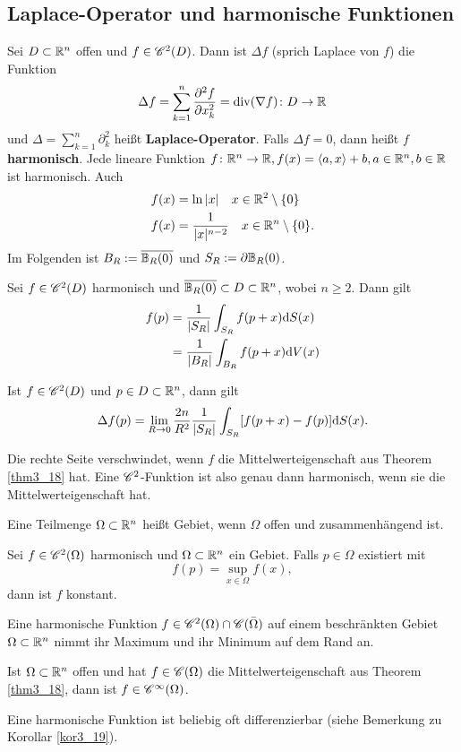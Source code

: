 \subsection{Laplace-Operator und harmonische Funktionen}
Sei $D \subset \mathbb{R}^n$ offen und $f \in \mathscr{C}^2(D)$. Dann ist $\Delta f$ (sprich Laplace von $f$) die Funktion
\[\Delta f = \sum_{k=1}^n \frac{\partial^2 f}{\partial x_k^2} = \mathrm{div}(\nabla f) \colon D \to \mathbb{R}\]
und $\Delta = \sum_{k=1}^n \partial_k^2$ heißt \textbf{Laplace-Operator}. Falls $\Delta f = 0$, dann heißt $f$ \textbf{harmonisch}. Jede lineare Funktion $f \colon \mathbb{R}^n \to \mathbb{R}, f(x) = \left\langle a,x \right\rangle + b, a \in \mathbb{R}^n, b \in \mathbb{R}$ ist harmonisch. Auch
\begin{align*}
	f(x) &= \ln |x| \quad x \in \mathbb{R}^2 \setminus \{0\}\\
	f(x) &= \frac{1}{|x|^{n-2}} \quad x \in \mathbb{R}^n \setminus  \{0\}.
\end{align*}
Im Folgenden ist $B_R := \overline{\mathbb{B}_R(0)}$ und $S_R := \partial \mathbb{B}_R(0)$. 
\begin{thm}\label{thm3_18}
	Sei $f \in \mathscr{C}^2 (D)$ harmonisch und $\overline{\mathbb{B}_R(0)} \subset D \subset \mathbb{R}^n$, wobei $n \geq 2$. Dann gilt
	\begin{align*}
		f(p) &= \frac{1}{|S_R|} \int_{S_R} f(p+x) \mathrm{d} S(x)\\
		&= \frac{1}{|B_R|} \int_{B_R} f(p+x) \mathrm{d} V(x)
	\end{align*}
\end{thm}
\begin{kor}\label{kor3_19}
	Ist $f \in \mathscr{C}^2(D)$ und $p \in D \subset \mathbb{R}^n$, dann gilt
	\[\Delta f(p) = \lim_{R \to 0} \frac{2n}{R^2} \frac{1}{|S_R|} \int_{S_R} [f(p+x) - f(p)] \mathrm{d} S(x).\]
\end{kor}
\begin{rem}
	Die rechte Seite verschwindet, wenn $f$ die Mittelwerteigenschaft aus Theorem \ref{thm3_18} hat. Eine $\mathscr{C}^2$-Funktion ist also genau dann harmonisch, wenn sie die Mittelwerteigenschaft hat.
\end{rem}
Eine Teilmenge $\Omega \subset \mathbb{R}^n$ heißt Gebiet, wenn $\Omega$ offen und zusammenhängend ist. 
\begin{thm}[Maximumsprinzip]\label{thm3_20}
	Sei $f \in \mathscr{C}^2(\Omega)$ harmonisch und $\Omega \subset \mathbb{R}^n$ ein Gebiet. Falls $p \in \Omega$ existiert mit
	\[f(p) = \sup_{x \in \Omega} f(x),\]
	dann ist $f$ konstant.
\end{thm}
\begin{kor}\label{kor3_21}
	Eine harmonische Funktion $f \in \mathscr{C}^2 (\Omega) \cap \mathscr{C}(\bar{\Omega})$ auf einem beschränkten Gebiet $\Omega \subset \mathbb{R}^n$ nimmt ihr Maximum und ihr Minimum auf dem Rand an.
\end{kor}
\begin{thm}
	Ist $\Omega \subset \mathbb{R}^n$ offen und hat $f \in \mathscr{C}(\Omega)$ die Mittelwerteigenschaft aus Theorem \ref{thm3_18}, dann ist $f \in \mathscr{C}^\infty (\Omega)$.
\end{thm}
\begin{folgerung}
	Eine harmonische Funktion ist beliebig oft differenzierbar (siehe Bemerkung zu Korollar \ref{kor3_19}).
\end{folgerung}
